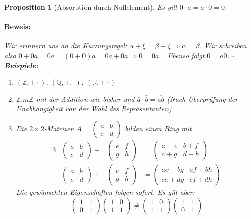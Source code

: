 \documentclass{report}
\newcommand{\R}{\mathbb{R}}
\newcommand{\Z}{\mathbb{Z}}
\newcommand{\Q}{\mathbb{Q}}
\newcommand{\al}{\alpha}
\theoremstyle{customrem}
\theoremstyle{customdef}
\newtheorem{prop}[definition]{Proposition}
\renewenvironment{proof}{\vspace{-.75cm}\paragraph{Beweis: }}{\vspace{-.5cm}\hfill$\square$}
\begin{document}
	\begin{prop}[Absorption durch Nullelement]
		Es gilt $0 \cdot a = a \cdot 0 = 0$.\\
		\begin{proof}
			Wir erinnern uns an die Kürzungsregel: $\al + \xi = \beta + \xi \Rightarrow \al = \beta$. Wir schreiben also $0 + 0a = 0a = (0 + 0) a = 0a + 0a \Rightarrow 0 = 0a$. \ Ebenso folgt $0 = a0$.
		\end{proof}\vspace{.75cm}
		\linebreak\textbf{Beispiele:}
		\begin{enumerate}
			\item $(\Z, + \cdot)$, $(\Q, +, \cdot)$, $(\R, + \cdot)$
			\item $\Z.m\Z$ mit der Addition wie bisher und $\bar{a} \cdot \bar{b} = \overline{ab}$ (Nach Überprüfung der Unabhängigkeit von der Wahl des Repräsentanten)
			\item Die $2\times2$-Matrizen $A = \begin{pmatrix}a & b\\c & d\end{pmatrix}$ bilden einen Ring mit\\
			\begin{alignat*}{3}
				&\begin{pmatrix}a & b\\c & d\end{pmatrix} + &\begin{pmatrix}e & f\\g & h\end{pmatrix} &= \begin{pmatrix}a + e & b + f\\c + g & d + h\end{pmatrix}\\
				&\begin{pmatrix}a & b\\c & d\end{pmatrix}\; \cdot &\begin{pmatrix}e & f\\g & h\end{pmatrix} &= \begin{pmatrix}ac+bg & af+bh\\ce+dg & cf+dh\end{pmatrix}
			\end{alignat*}
			Die gewünschten Eigenschaften folgen sofort. Es gilt aber:\\
			$$\begin{pmatrix}1 & 1\\0 & 1\end{pmatrix} \begin{pmatrix}1 & 0\\1 &1\end{pmatrix} \neq \begin{pmatrix}1 & 0\\1 & 1\end{pmatrix} \begin{pmatrix}1 & 1\\0 & 1\end{pmatrix}$$
		\end{enumerate}
	\end{prop}
\end{document}
